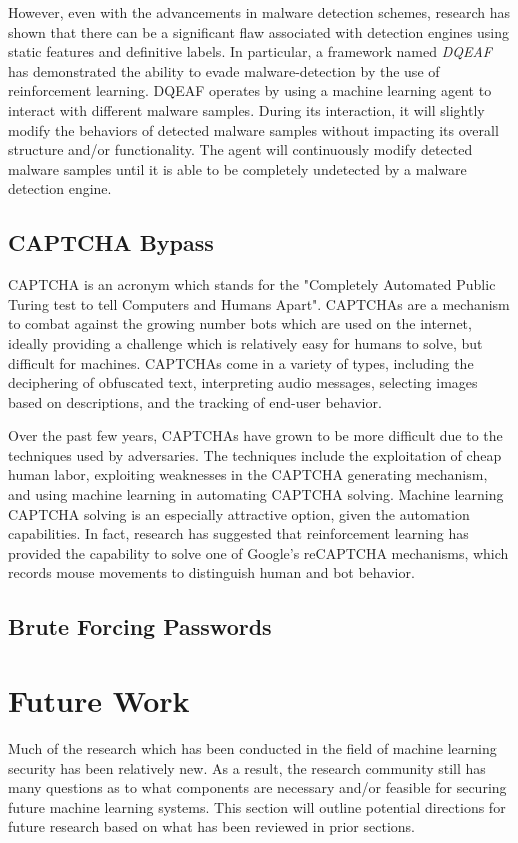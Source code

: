 \documentclass[11pt,conference]{IEEEtran}
\begin{document}
However, even with the advancements in malware detection schemes, research
has shown that there can be a significant flaw associated with detection
engines using static features and definitive labels. In particular, a framework
named \emph{DQEAF} has demonstrated the ability to evade malware-detection by
the use of reinforcement learning. DQEAF operates by using a machine
learning agent to interact with different malware samples. During its
interaction, it will slightly modify the behaviors of detected malware samples
without impacting its overall structure and/or functionality. The agent will
continuously modify detected malware samples until it is able to be completely
undetected by a malware detection engine.

\subsection{CAPTCHA Bypass}
CAPTCHA is an acronym which stands for the "Completely Automated Public Turing test
to tell Computers and Humans Apart". CAPTCHAs are a 
mechanism to combat against the growing number bots which are used on the
internet, ideally providing a challenge which is relatively easy for humans to
solve, but difficult for machines. CAPTCHAs come in a variety of types,
including the deciphering of obfuscated text, interpreting audio messages,
selecting images based on descriptions, and the tracking of end-user behavior.

Over the past few years, CAPTCHAs have grown to be more difficult due to the
techniques used by adversaries. The techniques include the exploitation of
cheap human labor, exploiting weaknesses in the CAPTCHA generating mechanism,
and using machine learning in automating CAPTCHA solving. Machine learning
CAPTCHA solving is an especially attractive option, given the automation
capabilities. In fact, research has suggested that reinforcement learning has
provided the capability to solve one of Google's reCAPTCHA mechanisms, which
records mouse movements to distinguish human and bot behavior.

\subsection{Brute Forcing Passwords}

\section{Future Work}
Much of the research which has been conducted in the field of machine learning
security has been relatively new. As a result, the research community still has
many questions as to what components are necessary and/or feasible for securing
future machine learning systems.
This section will outline potential directions for future research based on
what has been reviewed in prior sections.
\end{document}
